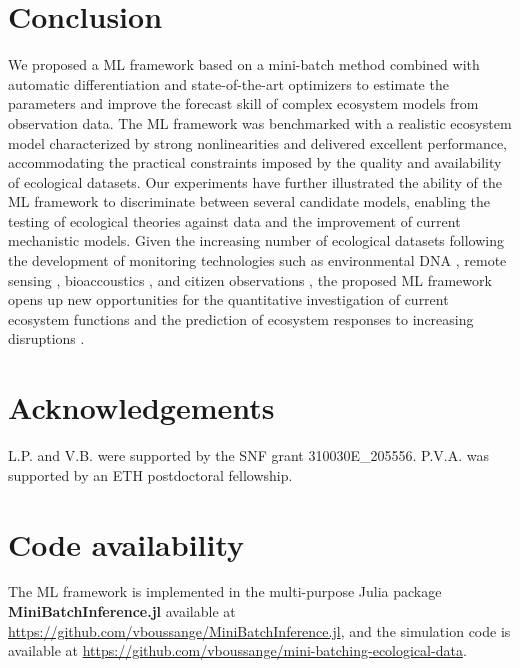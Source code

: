 \section{Conclusion}
We proposed a ML framework based on a mini-batch method combined with automatic differentiation and state-of-the-art optimizers to estimate the parameters and improve the forecast skill of complex ecosystem models from observation data.
% 
The ML framework was benchmarked with a realistic ecosystem model characterized by strong nonlinearities and delivered excellent performance, accommodating the practical constraints imposed by the quality and availability of ecological datasets.  Our experiments have further illustrated the ability of the ML framework to discriminate between several candidate models, enabling the testing of ecological theories against data and the improvement of current mechanistic models.
% 
Given the increasing number of ecological datasets following the development of monitoring technologies such as environmental DNA \citep{Ruppert2019}, remote sensing \citep{Jetz2019}, bioaccoustics \citep{Aide2013}, and citizen observations \citep{GBIF}, the proposed ML framework opens up new opportunities for the quantitative investigation of current ecosystem functions \citep{Curtsdotter2019} and the prediction of ecosystem responses to increasing disruptions \citep{Urban2016}.

\section{Acknowledgements}
L.P. and V.B. were supported by the SNF grant 310030E\_205556. P.V.A. was supported by an ETH postdoctoral fellowship. 

\section{Code availability}
The ML framework is implemented in the multi-purpose Julia package \textbf{MiniBatchInference.jl} available at \href{https://github.com/vboussange/MiniBatchInference.jl}{https://github.com/vboussange/MiniBatchInference.jl}, and the simulation code is available at \href{https://github.com/vboussange/mini-batching-ecological-data}{https://github.com/\linebreak vboussange/mini-batching-ecological-data}.

